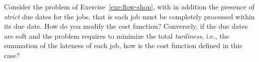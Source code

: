 \begin{exercise}
Consider the problem of Exercise~\ref{exe:flow-shop}, with in addition the presence of \emph{strict} due dates for the jobs, that is each job must be completely processed within its due date. How do you modify the cost function? Conversely, if the due dates are soft and the problem requires to minimize the total \emph{tardiness}, i.e., the summation of the lateness of each job, how is the cost function defined in this case?
\end{exercise}




